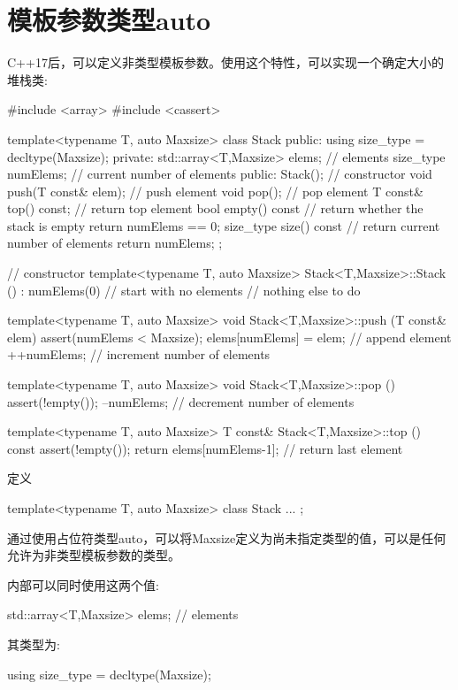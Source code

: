 \section{模板参数类型auto}
C++17后，可以定义非类型模板参数。使用这个特性，可以实现一个确定大小的堆栈类:

\begin{cpp}
#include <array>
#include <cassert>

template<typename T, auto Maxsize>
class Stack {
	public:
	using size_type = decltype(Maxsize);
private:
	std::array<T,Maxsize> elems; // elements
	size_type numElems; // current number of elements
public:
	Stack(); // constructor
	void push(T const& elem); // push element
	void pop(); // pop element
	T const& top() const; // return top element
	bool empty() const { // return whether the stack is empty
		return numElems == 0;
	}
	size_type size() const { // return current number of elements
		return numElems;
	}
};

// constructor
template<typename T, auto Maxsize>
Stack<T,Maxsize>::Stack ()
: numElems(0) // start with no elements
{
	// nothing else to do
}

template<typename T, auto Maxsize>
void Stack<T,Maxsize>::push (T const& elem)
{
	assert(numElems < Maxsize);
	elems[numElems] = elem; // append element
	++numElems; // increment number of elements
}

template<typename T, auto Maxsize>
void Stack<T,Maxsize>::pop ()
{
	assert(!empty());
	--numElems; // decrement number of elements
}

template<typename T, auto Maxsize>
T const& Stack<T,Maxsize>::top () const
{
	assert(!empty());
	return elems[numElems-1]; // return last element
}
\end{cpp}

定义

\begin{cpp}
template<typename T, auto Maxsize>
class Stack {
	...
};
\end{cpp}

通过使用占位符类型auto，可以将Maxsize定义为尚未指定类型的值，可以是任何允许为非类型模板参数的类型。

内部可以同时使用这两个值:

\begin{cpp}
std::array<T,Maxsize> elems; // elements
\end{cpp}

其类型为:

\begin{cpp}
using size_type = decltype(Maxsize);
\end{cpp}

